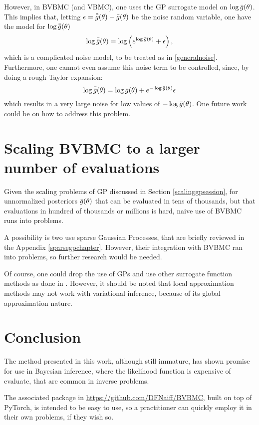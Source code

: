 However, in BVBMC (and VBMC), one uses the GP surrogate model on $\log {\bar{g}}(\theta)$. This implies that, letting $\epsilon = \hat{{\bar{g}}}(\theta) - {\bar{g}}(\theta)$ be the noise random variable, one have the model for $\log \bar{{\bar{g}}}(\theta)$
\begin{equation}
 \log \bar{{\bar{g}}}(\theta) = \log \left(e^{\log {\bar{g}}(\theta)} + \epsilon \right),
\end{equation}
which is a complicated noise model, to be treated as in \eqref{generalnoise}. Furthermore, one cannot even assume this noise term to be controlled, since, by doing a rough Taylor expansion:
\begin{equation}
\log \bar{{\bar{g}}}(\theta) = \log {\bar{g}}(\theta) + e^{-\log {\bar{g}}(\theta)} \epsilon
\end{equation}
which results in a very large noise for low values of $-\log {\bar{g}}(\theta)$. One future work could be on how to address this problem.

\section{Scaling BVBMC to a larger number of evaluations}
Given the scaling problems of GP discussed in Section \ref{scalinggpsession}, for unnormalized posteriors ${\bar{g}}(\theta)$ that can be evaluated in tens of thousands, but that evaluations in hundred of thousands or millions is hard, naive use of BVBMC runs into problems.

A possibility is two use sparse Gaussian Processes, that are briefly reviewed in the Appendix \ref{sparsegpchapter}. However, their integration with BVBMC ran into problems, so further research would be needed.

Of course, one could drop the use of GPs and use other surrogate function methods as done in \cite{Bliznyuk_2012,Marzouk_2007}. However, it should be noted that local approximation methods may not work with variational inference, because of its global approximation nature.

\section{Conclusion}
The method presented in this work, although still immature, has shown promise for use in Bayesian inference, where the likelihood function is expensive of evaluate, that are common in inverse problems.

The associated package in \url{https://github.com/DFNaiff/BVBMC}, built on top of PyTorch, is intended to be easy to use, so a practitioner can quickly employ it in their own problems, if they wish so.


 